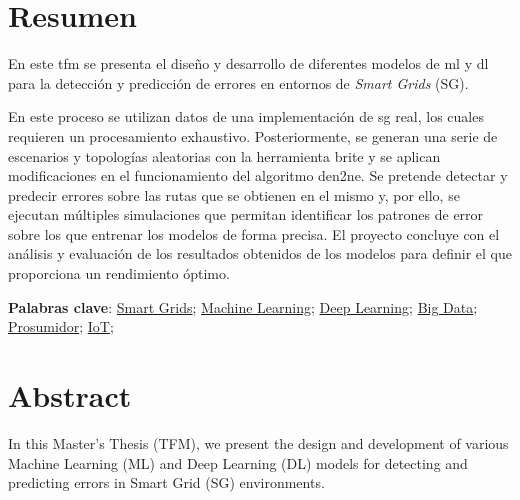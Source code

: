 \chapter{Resumen}
\thispagestyle{empty}
En este \gls{tfm} se presenta el diseño y desarrollo de diferentes modelos de \gls{ml} y \gls{dl} para la detección y predicción de errores en entornos de \textit{Smart Grids} (SG).

\vspace{3mm}

En este proceso se utilizan datos de una implementación de \gls{sg} real, los cuales requieren un procesamiento exhaustivo. Posteriormente, se generan una serie de escenarios y topologías aleatorias con la herramienta \acrshort{brite} y se aplican modificaciones en el funcionamiento del algoritmo \acrshort{den2ne}. Se pretende detectar y predecir errores sobre las rutas que se obtienen en el mismo y, por ello, se ejecutan múltiples simulaciones que permitan identificar los patrones de error sobre los que entrenar los modelos de forma precisa. El proyecto concluye con el análisis y evaluación de los resultados obtenidos de los modelos para definir el que proporciona un rendimiento óptimo.

\vspace{1cm}

\textbf{Palabras clave}: 
\href{https://scholar.google.com/scholar?q=smartgrids}{Smart Grids}; 
\href{https://scholar.google.com/scholar?hl=es&as_sdt=0,5&q=machine+learning}{Machine Learning};
\href{https://scholar.google.com/scholar?hl=es&as_sdt=0%2C5&q=deep+learning&btnG=}{Deep Learning}; 
\href{https://scholar.google.com/scholar?hl=es&as_sdt=0%2C5&q=big+data&btnG=}{Big Data};
\href{https://scholar.google.com/scholar?hl=es&as_sdt=0%2C5&q=prosumidor&btnG=}{Prosumidor}; 
\href{https://scholar.google.com/scholar?hl=es&as_sdt=0%2C5&q=iot&btnG=}{IoT}; 

\cleardoublepage %



\chapter{Abstract}
\thispagestyle{empty}

In this Master's Thesis (TFM), we present the design and development of various Machine Learning (ML) and Deep Learning (DL) models for detecting and predicting errors in Smart Grid (SG) environments. 

